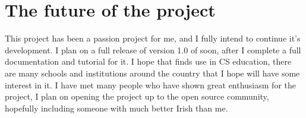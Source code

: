 \section{The future of the project}

This project has been a passion project for me, and I fully intend to continue it's development. I plan on a full release of version 1.0 of \Setanta{} soon, after I complete a full documentation and tutorial for it.
I hope that \Setanta{} finds use in CS education, there are many schools and institutions around the country that I hope will have some interest in it. I have met many people who have shown great enthusiasm for the project, I plan on opening the project up to the open source community, hopefully including someone with much better Irish than me.
